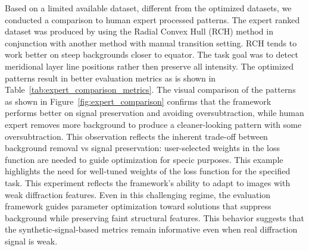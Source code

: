 \documentclass[iucr]{iucrjournals}
\begin{document}
Based on a limited available dataset, different from the optimized datasets, we conducted a comparison to human expert processed patterns. The expert ranked dataset was produced by using the Radial Convex Hull (RCH) method in conjunction with another method with manual transition setting. RCH tends to work better on steep backgrounds closer to equator. The task goal was to detect meridional layer line positions rather then preserve all intensity. The optimized patterns result in better evaluation metrics as is shown in Table~\ref{tab:expert_comparison_metrics}. The visual comparison of the patterns as shown in Figure~\ref{fig:expert_comparison} confirms that the framework performs better on signal preservation and avoiding oversubtraction, while human expert removes more background to produce a cleaner-looking pattern with some oversubtraction. This observation reflects the inherent trade-off between background removal vs signal preservation: user-selected weights in the loss function are needed to guide optimization for specic purposes. This example highlights the need for well-tuned weights of the loss function for the specified task. This experiment reflects the framework's ability to adapt to images with weak diffraction features. Even in this challenging regime, the evaluation framework guides parameter optimization toward solutions that suppress background while preserving faint structural features. This behavior suggests that the synthetic-signal-based metrics remain informative even when real diffraction signal is weak.

\end{document}
